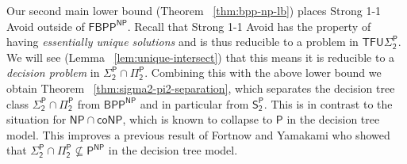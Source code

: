 \documentclass[11pt]{article}
\newtheorem{theorem}{Theorem}
\newcommand{\B}{\{0,1\}}
\newcommand{\rng}{\mathrm{range}}
\begin{document}
Our second main lower bound (Theorem ~\ref{thm:bpp-np-lb}) places Strong 1-1 Avoid outside of $\mathsf{FBPP^{NP}}$. 
Recall that Strong 1-1 Avoid has the property of having \emph{essentially unique solutions} and is thus reducible to a problem in $\mathsf{TFU\Sigma_2^P}$. We will see (Lemma ~\ref{lem:unique-intersect}) that this means it is reducible to a \emph{decision problem} in $\mathsf{\Sigma_2^P \cap \Pi_2^P}$. Combining this with the above lower bound we obtain Theorem ~\ref{thm:sigma2-pi2-separation}, which separates the decision tree class 
$\mathsf{\Sigma_2^P \cap \Pi_2^P}$ from $\mathsf{BPP^{NP}}$ and in particular from $\mathsf{S_2^P}$.
This is in contrast to the situation for $\mathsf{NP} \cap \mathsf{coNP}$, which is known to collapse to $\mathsf{P}$ in the decision tree model. This improves a previous result of Fortnow and Yamakami \cite{forntnow-yamakami} who showed that $\mathsf{\Sigma_2^P \cap \Pi_2^P} \not\subseteq \mathsf{P^{NP}}$ in the decision tree model.
\end{document}
